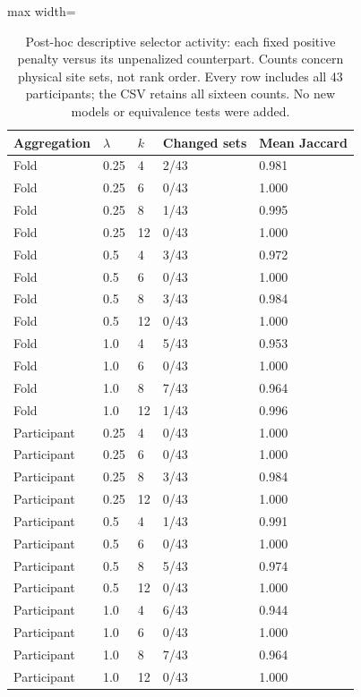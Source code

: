 \begin{table}[htbp]
\centering\small
\caption{Post-hoc descriptive selector activity: each fixed positive penalty versus its unpenalized counterpart. Counts concern physical site sets, not rank order. Every row includes all 43 participants; the CSV retains all sixteen counts. No new models or equivalence tests were added.}\label{tab:selectionchanges}
\begin{adjustbox}{max width=\textwidth}
\begin{tabular}{lllll}\toprule
Aggregation & $\lambda$ & $k$ & Changed sets & Mean Jaccard\\\midrule
Fold & 0.25 & 4 & 2/43 & 0.981\\
Fold & 0.25 & 6 & 0/43 & 1.000\\
Fold & 0.25 & 8 & 1/43 & 0.995\\
Fold & 0.25 & 12 & 0/43 & 1.000\\
Fold & 0.5 & 4 & 3/43 & 0.972\\
Fold & 0.5 & 6 & 0/43 & 1.000\\
Fold & 0.5 & 8 & 3/43 & 0.984\\
Fold & 0.5 & 12 & 0/43 & 1.000\\
Fold & 1.0 & 4 & 5/43 & 0.953\\
Fold & 1.0 & 6 & 0/43 & 1.000\\
Fold & 1.0 & 8 & 7/43 & 0.964\\
Fold & 1.0 & 12 & 1/43 & 0.996\\
Participant & 0.25 & 4 & 0/43 & 1.000\\
Participant & 0.25 & 6 & 0/43 & 1.000\\
Participant & 0.25 & 8 & 3/43 & 0.984\\
Participant & 0.25 & 12 & 0/43 & 1.000\\
Participant & 0.5 & 4 & 1/43 & 0.991\\
Participant & 0.5 & 6 & 0/43 & 1.000\\
Participant & 0.5 & 8 & 5/43 & 0.974\\
Participant & 0.5 & 12 & 0/43 & 1.000\\
Participant & 1.0 & 4 & 6/43 & 0.944\\
Participant & 1.0 & 6 & 0/43 & 1.000\\
Participant & 1.0 & 8 & 7/43 & 0.964\\
Participant & 1.0 & 12 & 0/43 & 1.000\\
\bottomrule\end{tabular}
\end{adjustbox}
\end{table}

